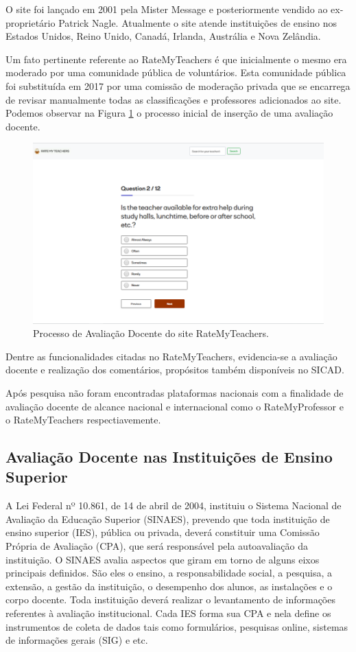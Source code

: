 \documentclass[12pt, a4paper]{report}
\begin{document}
O site foi lançado em 2001 pela Mister Message e posteriormente vendido ao ex-proprietário Patrick Nagle. Atualmente o site atende instituições de ensino nos Estados Unidos, Reino Unido, Canadá, Irlanda, Austrália e Nova Zelândia.

Um fato pertinente referente ao RateMyTeachers é que inicialmente o mesmo era moderado por uma comunidade pública de voluntários. Esta comunidade pública foi substituída em 2017 por uma comissão de moderação privada que se encarrega de revisar manualmente todas as classificações e professores adicionados ao site. 
Podemos observar na Figura \ref{fig:ratemyteacher} o processo inicial de inserção de uma avaliação docente.

\begin{figure}
\centering
\includegraphics[scale=0.45]{ratemyteachers.png}
\caption{Processo de Avaliação Docente do site RateMyTeachers.}
\label{fig:ratemyteacher}
\end{figure}

Dentre as funcionalidades citadas no RateMyTeachers, evidencia-se a  avaliação docente e realização dos comentários, propósitos também disponíveis no SICAD.

Após pesquisa não foram encontradas plataformas nacionais com a finalidade de avaliação docente de alcance nacional e internacional como o RateMyProfessor e o RateMyTeachers respectiavemente.

\subsection{Avaliação Docente nas Instituições de Ensino Superior}

 A Lei Federal nº 10.861, de 14 de abril de 2004, instituiu o Sistema Nacional de Avaliação da Educação Superior (SINAES), prevendo que toda instituição de ensino superior (IES), pública ou privada, deverá constituir uma Comissão Própria de Avaliação (CPA), que será responsável pela autoavaliação da instituição. O SINAES avalia aspectos que giram em torno de alguns eixos principais definidos. São eles o ensino, a responsabilidade social, a pesquisa, a extensão, a gestão da instituição, o desempenho dos alunos, as instalações e o corpo docente.
 Toda instituição deverá realizar o levantamento de informações referentes à avaliação institucional. Cada \ac{IES} forma sua \ac{CPA} e nela define os instrumentos de coleta de dados tais como formulários, pesquisas online, sistemas de informações gerais (SIG) e etc. 
 
\end{document}
